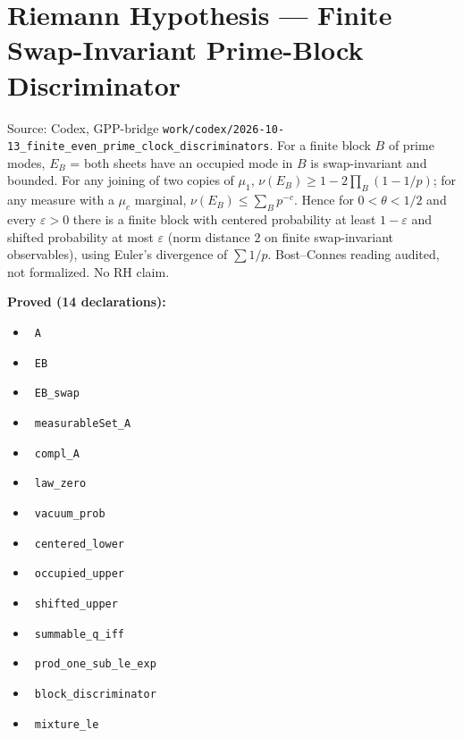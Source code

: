 \documentclass{report}
\theoremstyle{definition}
\begin{document}
\section{Riemann Hypothesis --- Finite Swap-Invariant Prime-Block Discriminator}
Source: Codex, GPP-bridge \texttt{work/codex/2026-10-13\_finite\_even\_prime\_clock\_discriminators}. For a finite block $B$ of prime modes, $E_B$ = both sheets have an occupied mode in $B$ is swap-invariant and bounded. For any joining of two copies of $\mu_1$, $\nu(E_B)\ge 1-2\prod_{B}(1-1/p)$; for any measure with a $\mu_c$ marginal, $\nu(E_B)\le\sum_B p^{-c}$. Hence for $0<\theta<1/2$ and every $\varepsilon>0$ there is a finite block with centered probability at least $1-\varepsilon$ and shifted probability at most $\varepsilon$ (norm distance $2$ on finite swap-invariant observables), using Euler's divergence of $\sum 1/p$. Bost--Connes reading audited, not formalized. No RH claim.

\noindent\textbf{Proved (14 declarations):}
\begin{itemize}
  \item {}\leanok\ \texttt{A}
  \item {}\leanok\ \texttt{EB}
  \item {}\leanok\ \texttt{EB\_swap}
  \item {}\leanok\ \texttt{measurableSet\_A}
  \item {}\leanok\ \texttt{compl\_A}
  \item {}\leanok\ \texttt{law\_zero}
  \item {}\leanok\ \texttt{vacuum\_prob}
  \item {}\leanok\ \texttt{centered\_lower}
  \item {}\leanok\ \texttt{occupied\_upper}
  \item {}\leanok\ \texttt{shifted\_upper}
  \item {}\leanok\ \texttt{summable\_q\_iff}
  \item {}\leanok\ \texttt{prod\_one\_sub\_le\_exp}
  \item {}\leanok\ \texttt{block\_discriminator}
  \item {}\leanok\ \texttt{mixture\_le}
\end{itemize}
\end{document}
